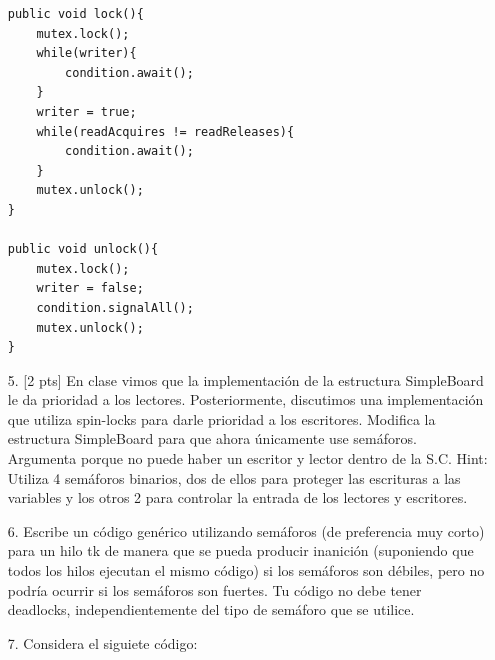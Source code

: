 \documentclass[12pt, letterpaper]{article}
\begin{document}
\begin{itemize}
\begin{minipage}{0.45\linewidth}
\begin{lstlisting}
public void lock(){
	mutex.lock();
	while(writer){
		condition.await();
	}	
	writer = true;
	while(readAcquires != readReleases){
		condition.await();
	}
	mutex.unlock();
}

public void unlock(){
	mutex.lock();
	writer = false;
	condition.signalAll();
	mutex.unlock();
}

\end{lstlisting}
\end{minipage}

\item[5. ][2 pts] En clase vimos que la implementación de la estructura SimpleBoard le
da prioridad a los lectores. Posteriormente, discutimos una implementación que
utiliza spin-locks para darle prioridad a los escritores. Modifica la estructura
SimpleBoard para que ahora únicamente use semáforos. Argumenta porque no
puede haber un escritor y lector dentro de la S.C. Hint: Utiliza 4 semáforos
binarios, dos de ellos para proteger las escrituras a las variables y los otros 2
para controlar la entrada de los lectores y escritores.

\item[6. ]Escribe un código genérico utilizando semáforos (de preferencia muy corto)
para un hilo tk de manera que se pueda producir inanición (suponiendo que
todos los hilos ejecutan el mismo código) si los semáforos son débiles, pero no
podría ocurrir si los semáforos son fuertes. Tu código no debe tener deadlocks,
independientemente del tipo de semáforo que se utilice.

\item[7. ]Considera el siguiete código:\\


\end{itemize}
\end{document}
